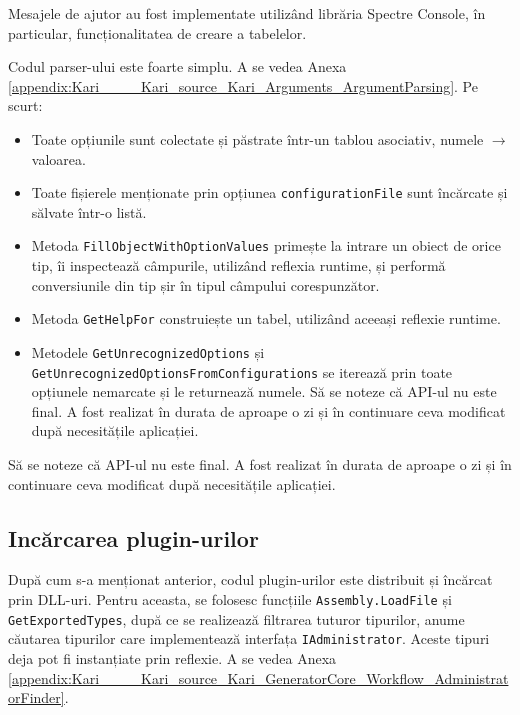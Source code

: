 \documentclass[a4paper,12pt]{report}
\begin{document}
Mesajele de ajutor au fost implementate utilizând librăria Spectre Console\cite{spectre_console_github}, în particular, funcționalitatea de creare a tabelelor.


Codul parser-ului este foarte simplu.
A se vedea Anexa \ref{appendix:Kari____Kari_source_Kari_Arguments_ArgumentParsing}.
Pe scurt:

\begin{itemize}
  \item Toate opțiunile sunt colectate și păstrate într-un tablou asociativ, numele $\rightarrow$ valoarea.
  \item Toate fișierele menționate prin opțiunea \texttt{configurationFile} sunt încărcate și sălvate într-o listă.
  \item Metoda \texttt{FillObjectWithOptionValues} primește la intrare un obiect de orice tip, îi inspectează câmpurile, utilizând reflexia runtime, și performă conversiunile din tip șir în tipul câmpului corespunzător.
  \item Metoda \texttt{GetHelpFor} construiește un tabel, utilizând aceeași reflexie runtime.
  \item Metodele \texttt{GetUnrecognizedOptions} și \texttt{GetUnrecognizedOptionsFromConfigurations} se iterează prin toate opțiunele nemarcate și le returnează numele.
  Să se noteze că \ac{API}-ul nu este final.
  A fost realizat în durata de aproape o zi și în continuare ceva modificat după necesitățile aplicației.
\end{itemize}

Să se noteze că \ac{API}-ul nu este final.
A fost realizat în durata de aproape o zi și în continuare ceva modificat după necesitățile aplicației.


\subsection{Incărcarea plugin-urilor}

După cum s-a menționat anterior, codul plugin-urilor este distribuit și încărcat prin \ac{DLL}-uri.
Pentru aceasta, se folosesc funcțiile \texttt{Assembly.LoadFile} și \texttt{GetExportedTypes}, după ce se realizează filtrarea tuturor tipurilor, anume căutarea tipurilor care implementează interfața \texttt{IAdministrator}.
Aceste tipuri deja pot fi instanțiate prin reflexie.
A se vedea Anexa \ref{appendix:Kari____Kari_source_Kari_GeneratorCore_Workflow_AdministratorFinder}.
\end{document}
